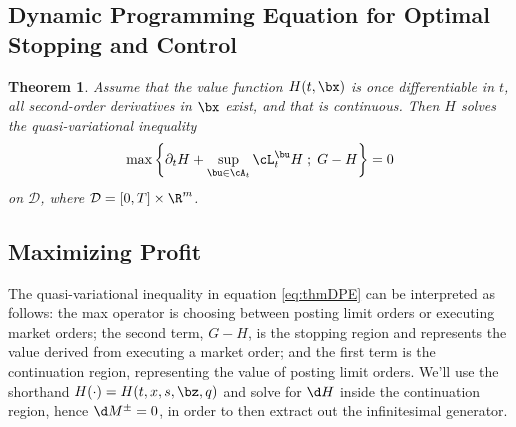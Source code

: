 \documentclass[12pt]{article}
\newtheorem{theorem}{Theorem}
\begin{document}
\subsection*{Dynamic Programming Equation for Optimal Stopping and Control}
\begin{theorem}
Assume that the value function $H(t,\bx)$ is once differentiable in $t$, all second-order derivatives in $\bx$ exist, and that  is continuous. Then $H$ solves the quasi-variational inequality
\begin{equation}
\label{eq:thmDPE}
\max \left\lbrace \partial_t H + \sup \limits_{\bu \in \cA_t} \cL^{\bu}_t H \; ; \; G - H \right\rbrace = 0
\end{equation}
on $\mathcal{D}$, where $\mathcal{D} = [0,T] \times \R^m$.
\end{theorem}

\subsection*{Maximizing Profit}
The quasi-variational inequality in equation \ref{eq:thmDPE} can be interpreted as follows: the max operator is choosing between posting limit orders or executing market orders; the second term, $G-H$, is the stopping region and represents the value derived from executing a market order; and the first term is the continuation region, representing the value of posting limit orders. We'll use the shorthand $H(\cdot) = H(t,x,s,\bz,q)$ and solve for $\d H$ inside the continuation region, hence $\d M^{\pm} = 0$, in order to then extract out the infinitesimal generator.
\end{document}
